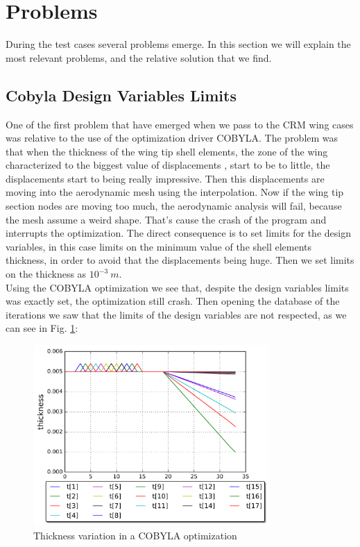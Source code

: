 \section{Problems}
During the test cases several problems emerge. In this section we will explain the most relevant problems, and the relative solution that we find. 
\subsection{Cobyla Design Variables Limits}
One of the first problem that have emerged when we pass to the CRM wing cases was relative to the use of the optimization driver COBYLA. The problem was that when the thickness of the wing tip shell elements, the zone of the wing characterized to the biggest value of displacements , start to be to little, the displacements start to being really impressive. Then this displacements are moving into the aerodynamic mesh using the interpolation. Now if the wing tip section nodes are moving too much, the aerodynamic analysis will fail, because the mesh assume a weird shape. That's cause the crash of the program and interrupts the optimization. The direct consequence is to set limits for the design variables, in this case limits on the minimum value of the shell elements thickness, in order to avoid that the displacements being huge. Then we set limits on the thickness as $10^{-3}\ m$.\\
Using the COBYLA optimization we see that, despite the design variables limits was exactly set, the optimization still crash. Then opening the database of the iterations we saw that the limits of the design variables are not respected, as we can see in Fig. \ref{fig:5_9}:
 \begin{figure}[H]
 	\centering
 	\includegraphics[width = 0.8\textwidth]{./Immagini/5_10.png}
 	\caption{Thickness variation in a COBYLA optimization}
 	\label{fig:5_9}
 \end{figure}
